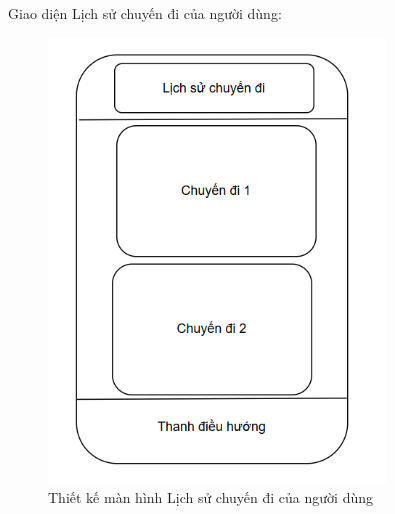 \documentclass[../DoAn.tex]{subfiles}
\begin{document}
Giao diện Lịch sử chuyến đi của người dùng:
\begin{figure}[H]
    \centering
    \includegraphics[width=0.8\textwidth]{Hinhve/Man_hinh_lich_su_chuyen_di_user.png}
    \caption{Thiết kế màn hình Lịch sử chuyến đi của người dùng}
    \label{fig:Thiet_ke_man_lich_su_chuyen_di_user}
\end{figure}
\end{document}
